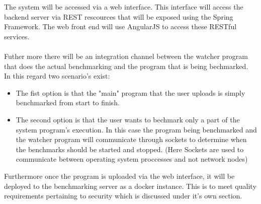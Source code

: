 The system will be accessed via a web interface. This interface will access the
backend server via REST rescources that will be exposed using the Spring
Framework. The web front end will use AngularJS to access these RESTful services.\\ \\
Futher more there will be an integration channel between the watcher program that
does the actual benchmarking and the program that is being bechmarked.\\
In this regard two scenario's exist:
\begin{itemize}
	\item The fist option is that the "main" program that the user uploads is simply
	benchmarked from start to finish.
	\item The second option is that the user wants to bechmark only a part of the
	system program's execution. In this case the program being benchmarked and
	the watcher program will communicate through sockets to determine when the
	benchmarks should be started and stopped. (Here Sockets are used to communicate
	between operating system proccesses and not network nodes)
\end{itemize}
Furthermore once the program is uploaded via the web interface, it will be deployed
to the benchmarking server as a docker instance. This is to meet quality requirements
pertaining to security which is discussed under it's own section.
